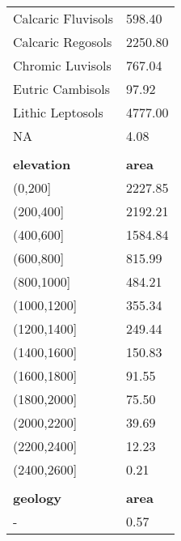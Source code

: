 \begin{longtable}{ll}
Calcaric Fluvisols                                 & 598.40           \\
Calcaric Regosols                                  & 2250.80          \\
Chromic Luvisols                                   & 767.04           \\
Eutric Cambisols                                   & 97.92            \\
Lithic Leptosols                                   & 4777.00          \\
NA                                                 & 4.08             \\
                                                   &                  \\
\textbf{elevation}                                 & \textbf{area}    \\
(0,200{]}                                          & 2227.85          \\
(200,400{]}                                        & 2192.21          \\
(400,600{]}                                        & 1584.84          \\
(600,800{]}                                        & 815.99           \\
(800,1000{]}                                       & 484.21           \\
(1000,1200{]}                                      & 355.34           \\
(1200,1400{]}                                      & 249.44           \\
(1400,1600{]}                                      & 150.83           \\
(1600,1800{]}                                      & 91.55            \\
(1800,2000{]}                                      & 75.50            \\
(2000,2200{]}                                      & 39.69            \\
(2200,2400{]}                                      & 12.23            \\
(2400,2600{]}                                      & 0.21             \\
                                                   &                  \\
\textbf{geology}                                   & \textbf{area}    \\
-                                                  & 0.57             \\

\end{longtable}
